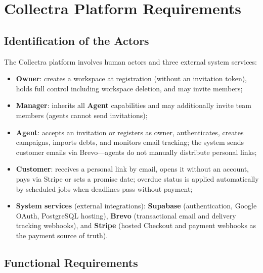\documentclass[12pt,a4paper]{report}
\begin{document}
\section{Collectra Platform Requirements}

\subsection{Identification of the Actors}

The Collectra platform involves human actors and three external system services:
\begin{itemize}
  \item \textbf{Owner}: creates a workspace at registration (without an invitation
        token), holds full control including workspace deletion, and may invite members;
  \item \textbf{Manager}: inherits all \textbf{Agent} capabilities and may
        additionally invite team members (agents cannot send invitations);
  \item \textbf{Agent}: accepts an invitation or registers as owner, authenticates,
        creates campaigns, imports debts, and monitors email tracking; the system
        sends customer emails via Brevo---agents do not manually distribute personal
        links;
  \item \textbf{Customer}: receives a personal link by email, opens it without an
        account, pays via Stripe or sets a promise date; overdue status is applied
        automatically by scheduled jobs when deadlines pass without payment;
  \item \textbf{System services} (external integrations): \textbf{Supabase}
        (authentication, Google OAuth, PostgreSQL hosting), \textbf{Brevo}
        (transactional email and delivery tracking webhooks), and \textbf{Stripe}
        (hosted Checkout and payment webhooks as the payment source of truth).
\end{itemize}

\subsection{Functional Requirements}
\end{document}
